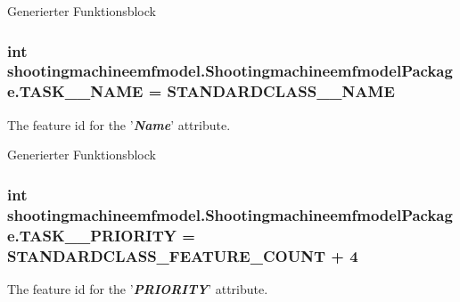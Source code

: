 Generierter Funktionsblock  \hypertarget{interfaceshootingmachineemfmodel_1_1_shootingmachineemfmodel_package_a62650844ac979a7c21389bde0193fea2}{
\subsubsection[{T\-A\-S\-K\-\_\-\-\_\-\-N\-A\-M\-E}]{\setlength{\rightskip}{0pt plus 5cm}int shootingmachineemfmodel.\-Shootingmachineemfmodel\-Package.\-T\-A\-S\-K\-\_\-\-\_\-\-N\-A\-M\-E = {\bf S\-T\-A\-N\-D\-A\-R\-D\-C\-L\-A\-S\-S\-\_\-\-\_\-\-N\-A\-M\-E}}}\label{interfaceshootingmachineemfmodel_1_1_shootingmachineemfmodel_package_a62650844ac979a7c21389bde0193fea2}
The feature id for the '{\itshape {\bfseries Name}}' attribute.

Generierter Funktionsblock  \hypertarget{interfaceshootingmachineemfmodel_1_1_shootingmachineemfmodel_package_a503bb84ed071da23eaa6ddf93697203e}{
\subsubsection[{T\-A\-S\-K\-\_\-\-\_\-\-P\-R\-I\-O\-R\-I\-T\-Y}]{\setlength{\rightskip}{0pt plus 5cm}int shootingmachineemfmodel.\-Shootingmachineemfmodel\-Package.\-T\-A\-S\-K\-\_\-\-\_\-\-P\-R\-I\-O\-R\-I\-T\-Y = {\bf S\-T\-A\-N\-D\-A\-R\-D\-C\-L\-A\-S\-S\-\_\-\-F\-E\-A\-T\-U\-R\-E\-\_\-\-C\-O\-U\-N\-T} + 4}}\label{interfaceshootingmachineemfmodel_1_1_shootingmachineemfmodel_package_a503bb84ed071da23eaa6ddf93697203e}
The feature id for the '{\itshape {\bfseries P\-R\-I\-O\-R\-I\-T\-Y}}' attribute.


